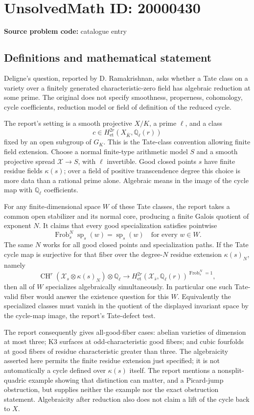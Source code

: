 \documentclass[11pt]{article}
\newcommand{\Q}{\mathbb{Q}}
\begin{document}
\section*{UnsolvedMath ID: 20000430}
\textbf{Source problem code:} catalogue entry
\subsection{Definitions and mathematical statement}
Deligne's question, reported by D. Ramakrishnan, asks whether a Tate class on a variety over a finitely generated characteristic-zero field has algebraic reduction at some prime. The original does not specify smoothness, properness, cohomology, cycle coefficients, reduction model or field of definition of the reduced cycle.

The report's setting is a smooth projective $X/K$, a prime $\ell$, and a class
\[
 c\in H^{2r}_{\mathrm{et}}(X_{\overline K},\Q_\ell(r))
\]
fixed by an open subgroup of $G_K$. This is the Tate-class convention allowing finite field extension. Choose a normal finite-type arithmetic model $S$ and a smooth projective spread $\mathcal X\to S$, with $\ell$ invertible. Good closed points $s$ have finite residue fields $\kappa(s)$; over a field of positive transcendence degree this choice is more data than a rational prime alone. Algebraic means in the image of the cycle map with $\Q_\ell$ coefficients.

For any finite-dimensional space $W$ of these Tate classes, the report takes a common open stabilizer and its normal core, producing a finite Galois quotient of exponent $N$. It claims that every good specialization satisfies pointwise
\[
 \operatorname{Frob}_s^N\operatorname{sp}_s(w)=\operatorname{sp}_s(w)
 \quad\text{for every }w\in W.
\]
The same $N$ works for all good closed points and specialization paths. If the Tate cycle map is surjective for that fiber over the degree-$N$ residue extension $\kappa(s)_N$, namely
\[
 \operatorname{CH}^r(\mathcal X_s\otimes\kappa(s)_N)\otimes\Q_\ell
 \longrightarrow
 H^{2r}_{\mathrm{et}}(\mathcal X_{\bar s},\Q_\ell(r))^{\operatorname{Frob}_s^N=1},
\]
then all of $W$ specializes algebraically simultaneously. In particular one such Tate-valid fiber would answer the existence question for this $W$. Equivalently the specialized classes must vanish in the quotient of the displayed invariant space by the cycle-map image, the report's Tate-defect test.

The report consequently gives all-good-fiber cases: abelian varieties of dimension at most three; K3 surfaces at odd-characteristic good fibers; and cubic fourfolds at good fibers of residue characteristic greater than three. The algebraicity asserted here permits the finite residue extension just specified; it is not automatically a cycle defined over $\kappa(s)$ itself. The report mentions a nonsplit-quadric example showing that distinction can matter, and a Picard-jump obstruction, but supplies neither the example nor the exact obstruction statement. Algebraicity after reduction also does not claim a lift of the cycle back to $X$.
\end{document}
